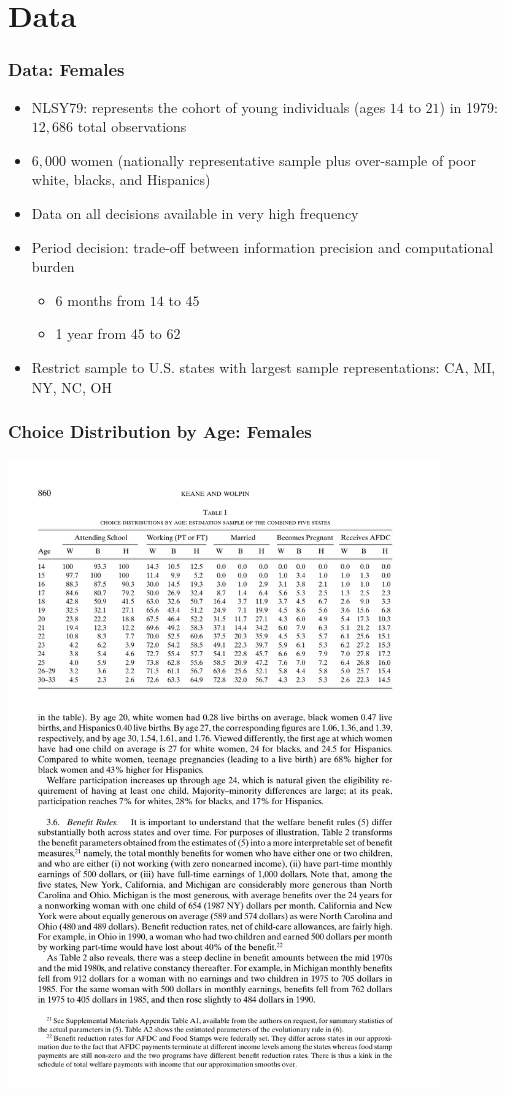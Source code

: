 \section{Data}

\begin{frame}
	\frametitle{Data: Females}
		\begin{itemize}
			\item NLSY79: represents the cohort of young individuals (ages $14$ to $21$) in 1979: $12,686$ total observations 
			\item $6,000$ women (nationally representative sample plus over-sample of poor white, blacks, and Hispanics)
			\item Data on all decisions available in very high frequency
			\item Period decision: trade-off between information precision and computational burden
			\begin{itemize}
				\item 6 months from $14$ to $45$
				\item 1 year from $45$ to $62$
			\end{itemize}						
			\item Restrict sample to U.S. states with largest sample representations: CA, MI, NY, NC, OH
		\end{itemize}
\end{frame}

\begin{frame}
	\frametitle{Choice Distribution by Age: Females}
	\includegraphics[width=4.5in]{tab-figs/table1_2010.pdf}
\end{frame}

